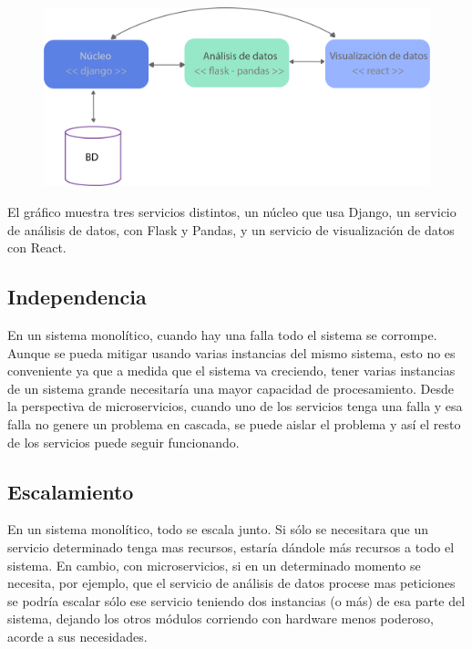 \begin{figure}[h!]
  \centering
    \includegraphics{images/heterogeneidad-tecnologica.png}
  \label{fig:microht}
\end{figure}

\break

El gráfico muestra tres servicios distintos, un núcleo que usa Django, un servicio de análisis de datos, con Flask y Pandas, y un servicio de visualización de datos con React.

\subsection[Independencia]{Independencia}

En un sistema monolítico, cuando hay una falla todo el sistema se corrompe. Aunque se pueda mitigar usando varias instancias del mismo sistema, esto no es conveniente ya que a medida que el sistema va creciendo, tener varias instancias de un sistema grande necesitaría una mayor capacidad de procesamiento.
Desde la perspectiva de microservicios, cuando uno de los servicios tenga una falla y esa falla no genere un problema en cascada, se puede aislar el problema y así el resto de los servicios puede seguir funcionando. 

\subsection[Escalamiento]{Escalamiento}

En un sistema monolítico, todo se escala junto. Si sólo se necesitara que un servicio determinado tenga mas recursos, estaría dándole más recursos a todo el sistema.
En cambio, con microservicios, si en un determinado momento se necesita, por ejemplo, que el servicio de análisis de datos procese mas peticiones se podría escalar sólo ese servicio teniendo dos instancias (o más) de esa parte del sistema, dejando los otros módulos corriendo con hardware menos poderoso, acorde a sus necesidades.

